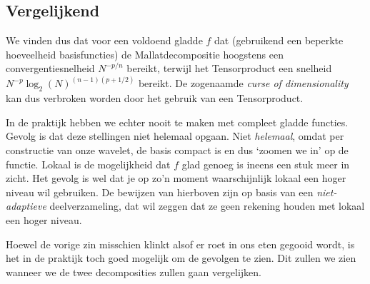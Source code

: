 \subsection{Vergelijkend}
We vinden dus dat voor een voldoend gladde $f$ dat (gebruikend een beperkte hoeveelheid basisfuncties) de Mallatdecompositie hoogstens een convergentiesnelheid $N^{-p/n}$ bereikt, terwijl het Tensorproduct een snelheid $N^{-p} \log_2(N)^{(n-1)(p+1/2)}$ bereikt. De zogenaamde \emph{curse of dimensionality} kan dus verbroken worden door het gebruik van een Tensorproduct.


In de praktijk hebben we echter nooit te maken met compleet gladde functies. Gevolg is dat deze stellingen niet helemaal opgaan. Niet \emph{helemaal}, omdat per constructie van onze wavelet, de basis compact is en dus `zoomen we in' op de functie. Lokaal is de mogelijkheid dat $f$ glad genoeg is ineens een stuk meer in zicht. Het gevolg is wel dat je op zo'n moment waarschijnlijk lokaal een hoger niveau wil gebruiken. De bewijzen van hierboven zijn op basis van een \emph{niet-adaptieve} deelverzameling, dat wil zeggen dat ze geen rekening houden met lokaal een hoger niveau.

Hoewel de vorige zin misschien klinkt alsof er roet in ons eten gegooid wordt, is het in de praktijk toch goed mogelijk om de gevolgen te zien. Dit zullen we zien wanneer we de twee decomposities zullen gaan vergelijken.

